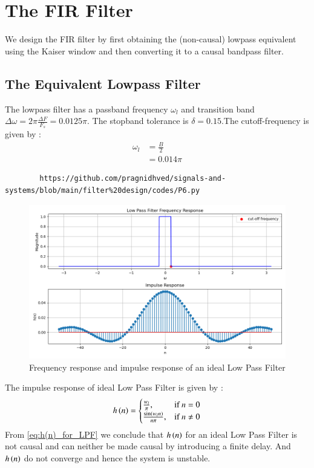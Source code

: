 \documentclass{article}
\begin{document}
	\section{The FIR Filter}
	We design the FIR filter by first obtaining the (non-causal) lowpass equivalent using the Kaiser window
	and then
	converting it to a causal bandpass filter.
	\subsection{The Equivalent Lowpass Filter}
	The lowpass filter has a passband frequency $\omega_l$ and transition band $\Delta \omega = 2\pi \frac{\Delta F}{F_s} = 0.0125\pi$.
	The stopband tolerance is $\delta=0.15$.The cutoff-frequency is given by :
	\begin{align}
		\omega_{l} &= \frac{B}{2}\\
		&= 0.014\pi
	\end{align}
	\begin{lstlisting}
		https://github.com/pragnidhved/signals-and-systems/blob/main/filter%20design/codes/P6.py
	\end{lstlisting}
	\begin{figure}[htbp]
		\centering
		\includegraphics[width=1\linewidth]{figs/fig6}
		\caption{Frequency response and impulse response of an ideal Low Pass Filter}
		\label{fig:LPF_FIR_1}
	\end{figure}
	The impulse response of ideal Low Pass Filter is given by :
	\begin{align}
		h\left(n\right) = 
		\begin{cases} 
			\frac{w_l}{\pi}, & \text{if } n = 0 \\
			\frac{\sin(w_l n)}{n\pi}, & \text{if } n \neq 0
		\end{cases} \label{eq:h(n)_for_LPF}
	\end{align}
	From \eqref{eq:h(n)_for_LPF} we conclude that $h\left(n\right)$ for an ideal Low Pass Filter is not causal and can neither be made causal by introducing a finite delay. And $h\left(n\right)$ do not converge and hence the system is unstable.
\end{document}
